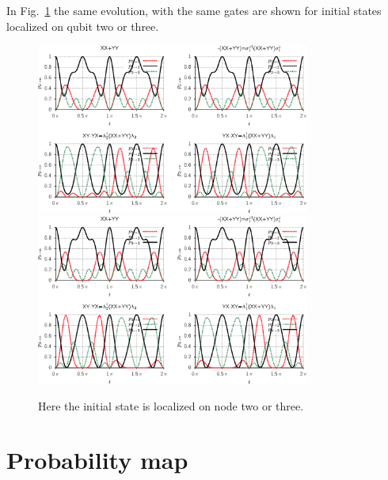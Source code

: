 \documentclass[aps,pra,12pt,nofootinbib,superscriptaddress,longbibliography,showpacs]{revtex4-1}
\theoremstyle{plain}
\theoremstyle{definition}
\begin{document}
In Fig.~\ref{fig:init23} the same evolution, with the same gates are shown for
initial states localized on qubit two or three.


\begin{figure}[p]
  \centering
  \includegraphics[width=0.8\textwidth]{3qbit_010}\\
  \vskip 10pt
  \includegraphics[width=0.8\textwidth]{3qbit_100}
  \caption{Here the initial state is localized on node two or three.}
  \label{fig:init23}
\end{figure}






\section{Probability map} 
\end{document}
